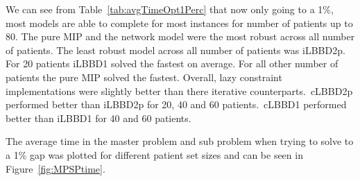 We can see from Table~\ref{tab:avgTimeOpt1Perc} that now only going to a 1\%, most models are able to complete for most instances for number of patients up to 80. The pure MIP and the network model were the most robust across all number of patients. The least robust model across all number of patients was iLBBD2p. For 20 patients iLBBD1 solved the fastest on average. For all other number of patients the pure MIP solved the fastest. Overall, lazy constraint implementations were slightly better than there iterative counterparts.\ cLBBD2p performed better than iLBBD2p for 20, 40 and 60 patients.\ cLBBD1 performed better than iLBBD1 for 40 and 60 patients. 

The average time in the master problem and sub problem when trying to solve to a 1\% gap was plotted for different patient set sizes and can be seen in Figure~\ref{fig:MPSPtime}.

